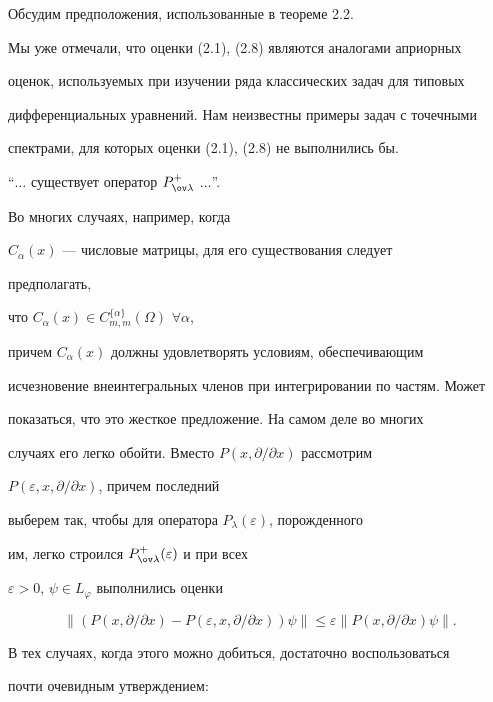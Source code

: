  


Обсудим предположения, использованные в теореме 2.2. 


 


Мы уже отмечали, что оценки (2.1), (2.8) являются аналогами априорных 


оценок, используемых при изучении ряда классических задач для типовых 


дифференциальных уравнений. Нам неизвестны примеры задач с точечными 


спектрами, для которых оценки (2.1), (2.8) не выполнились бы. 


 


``$\dotsc$ существует оператор $P^+_{\ov\lambda}$ $\dotsc$''. 


Во многих случаях, например, когда 


$C_\alpha(x)$ --- числовые матрицы, для его существования следует 


предполагать, 


что $C_\alpha(x)\in C^{\{\alpha\}}_{m,m}(\Omega)$ $\forall\alpha$, 


причем $C_\alpha(x)$ должны удовлетворять условиям, обеспечивающим 


исчезновение внеинтегральных членов при интегрировании по частям. Может 


показаться, что это жесткое предложение. На самом деле во многих 


случаях его легко обойти. Вместо $P(x,\partial/\partial x)$ рассмотрим 


$P(\varepsilon,x,\partial/\partial x)$, причем последний 


выберем так, чтобы для оператора $P_\lambda(\varepsilon)$, порожденного 


им, легко строился $P^+_{\ov\lambda}(\varepsilon)$ и при всех 


$\varepsilon>0$, $\psi\in L_\varphi$ выполнились оценки 


$$ 


\|(P(x,\partial/\partial x)-P(\varepsilon,x,\partial/\partial x))\psi\| 


\le\varepsilon\|P(x,\partial/\partial x)\psi\|. 


$$ 


В тех случаях, когда этого можно добиться, достаточно воспользоваться 


почти очевидным утверждением: 


\medskip 


